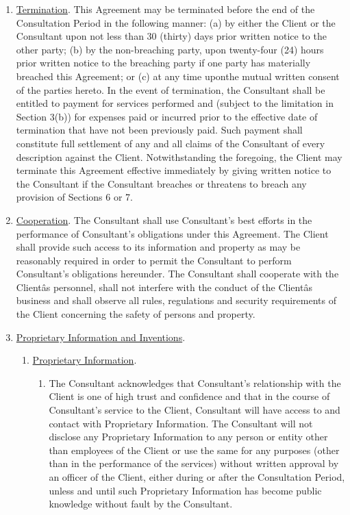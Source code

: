 \documentclass[12pt]{article}
\begin{document}
\begin{enumerate}
\begin{enumerate}
    \end{enumerate}
    \item \underline{Termination}. This Agreement may be terminated before the end of the Consultation Period in the following manner: (a) by either the Client or the Consultant upon not less than 30 (thirty) days prior written notice to the other party; (b) by the non-breaching party, upon twenty-four (24) hours prior written notice to the breaching party if one party has materially breached this Agreement; or (c) at any time uponthe mutual written consent of the parties hereto.  In the event of termination, the Consultant shall be entitled to payment for services performed and (subject to the limitation in Section 3(b)) for expenses paid or incurred prior to the effective date of termination that have not been previously paid.  Such payment shall constitute full settlement of any and all claims of the Consultant of every description against the Client.  Notwithstanding the foregoing, the Client may terminate this Agreement effective immediately by giving written notice to the Consultant if the Consultant breaches or threatens to breach any provision of Sections 6 or 7.
    \item \underline{Cooperation}.  The Consultant shall use Consultant's best efforts in the performance of Consultant's obligations under this Agreement.  The Client shall provide such access to its information and property as may be reasonably required in order to permit the Consultant to perform Consultant's obligations hereunder.  The Consultant shall cooperate with the Clientâs personnel, shall not interfere with the conduct of the Clientâs business and shall observe all rules, regulations and security requirements of the Client concerning the safety of persons and property.
    \item \underline{Proprietary Information and Inventions}.
    \begin{enumerate}
        \item \underline{Proprietary Information}.
        \begin{enumerate}[(1)]
            \item The Consultant acknowledges that Consultant's relationship with the Client is one of high trust and confidence and that in the course of Consultant's service to the Client, Consultant will have access to and contact with Proprietary Information.  The Consultant will not disclose any Proprietary Information to any person or entity other than employees of the Client or use the same for any purposes (other than in the performance of the services) without written approval by an officer of the Client, either during or after the Consultation Period, unless and until such Proprietary Information has become public knowledge without fault by the Consultant.

\end{enumerate}
\end{enumerate}
\end{enumerate}
\end{document}
